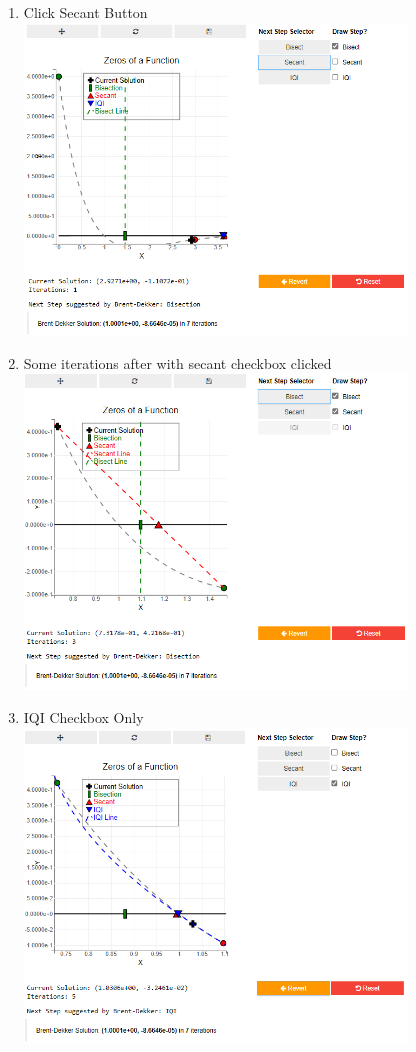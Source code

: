 \begin{enumerate}
    \item Click Secant Button\\
    \includegraphics[width=0.8\textwidth]{Include/Images/Thesis/Documentation/Visualizers/NonLinear/Example 1/Example 1 - 02 - Click Secant.png}
    \item Some iterations after with secant checkbox clicked\\
    \includegraphics[width=0.8\textwidth]{Include/Images/Thesis/Documentation/Visualizers/NonLinear/Example 1/Example 1 - 03 - SOme iterations with secant checkbox.png}
    \item IQI Checkbox Only\\
    \includegraphics[width=0.8\textwidth]{Include/Images/Thesis/Documentation/Visualizers/NonLinear/Example 1/Example 1 - 04 - IQI checkbox only.png}


\end{enumerate}
